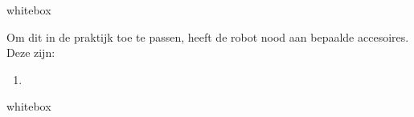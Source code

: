 \documentclass{beamer}
\begin{document}
\begin{frame}[t]
\begin{columns}[t]
\begin{column}{\textwidth}
\begin{beamercolorbox}{whitebox}
\begin{figure}
	\end{figure}

	\vspace{0.5em}
	
        Om dit in de praktijk toe te passen, heeft de robot nood aan bepaalde accesoires.
        Deze zijn:
        \begin{enumerate}
            \item 
        \end{enumerate}

	
	\end{beamercolorbox}

        \begin{beamercolorbox}{whitebox}

        \end{beamercolorbox}
	\end{column}



\end{columns}
\end{frame}
\end{document}
